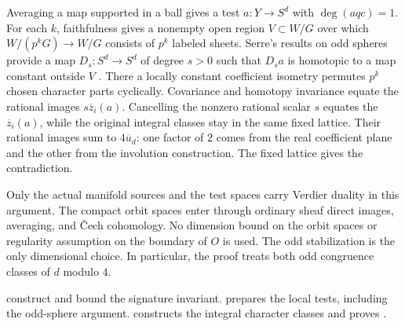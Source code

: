 Averaging a map supported in a ball gives a test \(a:Y\to S^d\)
with \(\deg(aqc)=1\). For each \(k\), faithfulness gives a nonempty
open region \(V\subset W/G\) over which
\(W/(p^kG)\to W/G\) consists of \(p^k\) labeled sheets.
Serre's results on odd spheres provide a map \(D_s:S^d\to S^d\)
of degree \(s>0\) such that \(D_s a\) is homotopic to a map constant
outside \(V\) \cite{Serre1951,Serre1953}. There a locally constant coefficient
isometry permutes \(p^k\) chosen character parts cyclically.
Covariance and homotopy invariance equate the rational images
\(s\overline{z}_i(a)\). Cancelling the nonzero rational scalar \(s\)
equates the \(\overline{z}_i(a)\), while the original integral classes
stay in the same fixed lattice. Their rational images sum to
\(4\overline{u}_d\): one factor of \(2\) comes from the real coefficient
plane and the other from the involution construction. The fixed lattice
gives the contradiction.

Only the actual manifold sources and the test spaces carry Verdier
duality in this argument. The compact orbit spaces enter through
ordinary sheaf direct images, averaging, and \v{C}ech cohomology.
No dimension bound on the orbit spaces or regularity assumption on
the boundary of \(O\) is used.
The odd stabilization is the only dimensional choice. In particular,
the proof treats both odd congruence classes of \(d\) modulo \(4\).

 construct and bound
the signature invariant.  prepares the local
tests, including the odd-sphere argument. 
constructs the integral character classes and proves
.

